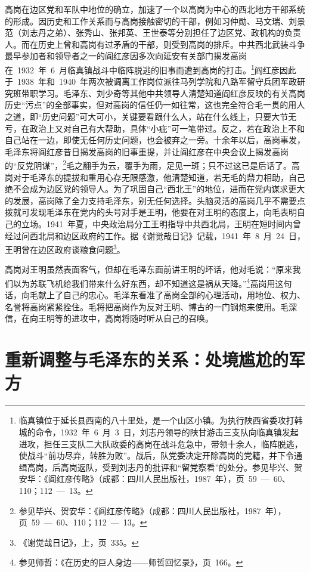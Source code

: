 高岗在边区党和军队中地位的确立，加速了一个以高岗为中心的西北地方干部系统的形成。因历史和工作关系而与高岗接触密切的干部，例如习仲勋、马文瑞、刘景范（刘志丹之弟）、张秀山、张邦英、王世泰等分别担任了边区党、政机构的负责人。而在历史上曾和高岗有过矛盾的干部，则受到高岗的排斥。中共西北武装斗争最早参加者和领导者之一的阎红彦因多次向延安有关部门揭发高岗在~1932~年~6~月临真镇战斗中临阵脱逃的旧事而遭到高岗的打击。\footnote{临真镇位于延长县西南的八十里处，是一个山区小镇。为执行陕西省委攻打韩城的命令，1932~年~6~月~3~日，刘志丹领导的陕甘游击三支队向临真镇发起进攻，担任三支队二大队政委的高岗在战斗危急中，带领十余人，临阵脱逃，使战斗“前功尽弃，转胜为败”。战后，队党委决定开除高岗的党籍，并下令通缉高岗，后高岗返队，受到刘志丹的批评和“留党察看”的处分。参见毕兴、贺安华：《阎红彦传略》（成都：四川人民出版社，1987~年），页~59~—~60、110；112~—~13。}阎红彦因此于~1938~年和~1940~年两次被调离工作岗位派往马列学院和八路军留守兵团军政研究班带职学习。毛泽东、刘少奇等其他中共领导人清楚知道阎红彦反映的有关高岗历史“污点”的全部事实，但对高岗的信任仍一如往常，这也完全符合毛一贯的用人之道，即“历史问题”可大可小，关键要看跟什么人，站在什么线上，只要大节无亏，在政治上又对自己有大帮助，具体“小疵”可一笔带过。反之，若在政治上不和自己站在一边，即使无任何历史问题，也会被弃之一旁。十余年以后，高岗事发，毛泽东将阎红彦昔日揭发高岗的旧事重提，并让阎红彦在中央会议上揭发高岗的“反党阴谋”，\footnote{参见毕兴、贺安华：《阎红彦传略》（成都：四川人民出版社，1987~年），页~59~—~60、110；112~—~13。}毛之翻手为云，覆手为雨，足见一斑；只不过这已是后话了。高岗对于毛泽东的提拔和重用心存无限感激，他清楚知道，若无毛的鼎力相助，自己绝不会成为边区党的领导人。为了巩固自己“西北王”的地位，进而在党内谋求更大的发展，高岗除了全力支持毛泽东，别无任何选择。头脑灵活的高岗几乎不需要点拨就可发现毛泽东在党内的头号对手是王明，他要在对王明的态度上，向毛表明自己的立场。1941~年夏，中央政治局分工王明指导中共西北局，王明在短时间内曾经过问西北局和边区政府的工作。据《谢觉哉日记》记载，1941~年~8~月~24~日，王明曾在边区政府谈粮食问题\footnote{《谢觉哉日记》，上，页~335。}。

高岗对王明虽然表面客气，但却在毛泽东面前讲王明的坏话，他对毛说：“原来我们以为苏联飞机给我们带来什么好东西，却不知道这是祸从天降。”\footnote{参见师哲：《在历史的巨人身边——师哲回忆录》，页~166。}高岗用这句话，向毛献上了自己的忠心。毛泽东看准了高岗全部的心理活动，用地位、权力、名誉将高岗紧紧拴住。毛将把高岗作为反对王明、博古的一门钢炮来使用。毛深信，在向王明等的进攻中，高岗将随时听从自己的召唤。

\section{重新调整与毛泽东的关系：处境尴尬的军方}

